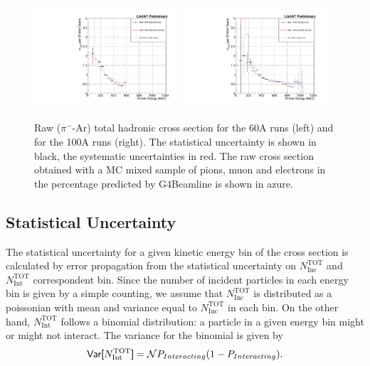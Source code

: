 \begin{figure}
\centering  
\includegraphics[width=0.48\textwidth]{Chapter-6/Images/Plots60A_MCData_XS_StatSyst.pdf}
\includegraphics[width=0.48\textwidth]{Chapter-6/Images/Plots100A_MCData_XS_StatSyst.pdf}
\caption{Raw ($\pi^-$-Ar) total hadronic cross section for the 60A runs (left) and for the 100A runs (right). The statistical uncertainty is shown in black, the systematic uncertainties in red. The raw cross section obtained with a MC mixed sample of pions, muon and electrons in the percentage predicted by G4Beamline is shown in azure. }
\label{fig:XSRaw}
\end{figure}


\subsection{Statistical Uncertainty}\label{ch:StatUncertaintyXSRaw}
The statistical uncertainty for a given kinetic energy bin of the cross section  is calculated by error propagation from the statistical uncertainty on $N^{\text{TOT}}_{\text{Inc}}$ and $N^{\text{TOT}}_{\text{Int}}$ correspondent bin.  Since the number of incident particles in each energy bin is given by a simple counting, we assume that $N^{\text{TOT}}_{\text{Inc}}$ is distributed as a poissonian with mean and variance equal to $N^{\text{TOT}}_{\text{Inc}}$ in each bin.  
On the other hand, $N^{\text{TOT}}_{\text{Int}}$ follows a binomial distribution: a particle in a given energy bin might or might not interact.  The variance for the binomial is given by  
\begin{equation}
\text{\textsf{Var[}} N^{\text{TOT}}_{\text{Int}} \text{\textsf{]}}
 = \mathcal{N}P_{Interacting}(1-P_{Interacting}).
\label{eq:binVar}
\end{equation}


